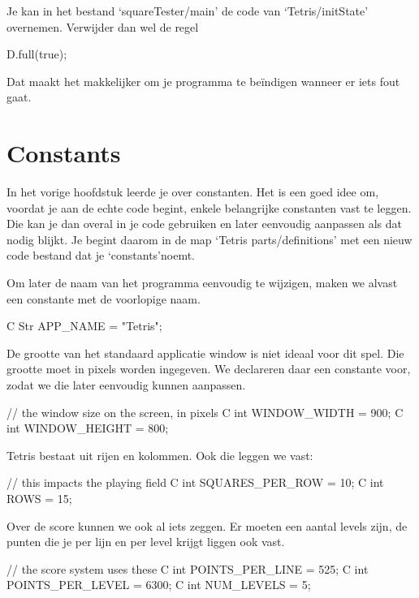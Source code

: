 Je kan in het bestand `squareTester/main' de code van `Tetris/initState' overnemen. Verwijder dan wel de regel 
	
\begin{code}
D.full(true);
\end{code}

Dat maakt het makkelijker om je programma te be\"indigen wanneer er iets fout gaat.	

\section{Constants}
In het vorige hoofdstuk leerde je over constanten. Het is een goed idee om, voordat je aan de echte code begint, enkele belangrijke constanten vast te leggen. Die kan je dan overal in je code gebruiken en later eenvoudig aanpassen als dat nodig blijkt. Je begint daarom in de map `Tetris parts/definitions' met een nieuw code bestand dat je `constants'noemt.

Om later de naam van het programma eenvoudig te wijzigen, maken we alvast een constante  met de voorlopige naam.

\begin{code}
C Str APP_NAME = "Tetris";
\end{code}

De grootte van het standaard applicatie window is niet ideaal voor dit spel. Die grootte moet in pixels worden ingegeven. We declareren daar een constante  voor, zodat we die later eenvoudig kunnen aanpassen.

\begin{code}
// the window size on the screen, in pixels
C int WINDOW_WIDTH  = 900;
C int WINDOW_HEIGHT = 800;
\end{code}

Tetris bestaat uit rijen en kolommen. Ook die leggen we vast:

\begin{code}
// this impacts the playing field
C int SQUARES_PER_ROW = 10;
C int ROWS            = 15;
\end{code}

Over de score kunnen we ook al iets zeggen. Er moeten een aantal levels zijn, de punten die je per lijn en per level krijgt liggen ook vast.

\begin{code}
// the score system uses these
C int POINTS_PER_LINE  =  525;
C int POINTS_PER_LEVEL = 6300;
C int NUM_LEVELS       =    5;
\end{code}

